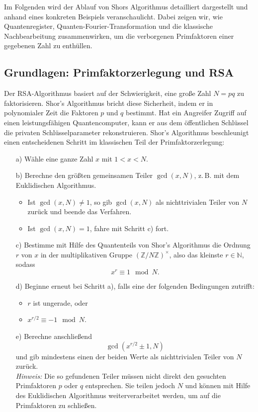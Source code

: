 Im Folgenden wird der Ablauf von Shors Algorithmus detailliert dargestellt und anhand eines konkreten Beispiels veranschaulicht. Dabei zeigen wir, wie Quantenregister, Quanten-Fourier-Transformation und die klassische Nachbearbeitung zusammenwirken, um die verborgenen Primfaktoren einer gegebenen Zahl zu enthüllen.\\


\subsection{Grundlagen: Primfaktorzerlegung und RSA}
Der RSA-Algorithmus basiert auf der Schwierigkeit, eine große Zahl \( N = pq \) zu faktorisieren. Shor’s Algorithmus bricht diese Sicherheit, indem er in polynomialer Zeit die Faktoren \( p \) und \( q \) bestimmt. Hat ein Angreifer Zugriff auf einen leistungsfähigen Quantencomputer, kann er aus dem öffentlichen Schlüssel die privaten Schlüsselparameter rekonstruieren. Shor's Algorithmus beschleunigt einen entscheidenen Schritt im klassischen Teil der Primfaktorzerlegung:

\begin{itemize}
  \item[a)] Wähle eine ganze Zahl \(x\) mit \(1 < x < N\).
  
  \item[b)] Berechne den größten gemeinsamen Teiler \(\gcd(x, N)\), z.\,B. mit dem Euklidischen Algorithmus.  
  \begin{itemize}
    \item Ist \(\gcd(x, N) \ne 1\), so gib \(\gcd(x, N)\) als nichttrivialen Teiler von \(N\) zurück und beende das Verfahren.
    \item Ist \(\gcd(x, N) = 1\), fahre mit Schritt c) fort.
  \end{itemize}
  
  \item[c)] Bestimme mit Hilfe des Quantenteils von Shor's Algorithmus die Ordnung \(r\) von \(x\) in der multiplikativen Gruppe \((\mathbb{Z}/N\mathbb{Z})^\times\), also das kleinste \(r \in \mathbb{N}\), sodass
  \[
  x^r \equiv 1 \mod N.
  \]
  
  \item[d)] Beginne erneut bei Schritt a), falls eine der folgenden Bedingungen zutrifft:
  \begin{itemize}
    \item \(r\) ist ungerade, oder
    \item \(x^{r/2} \equiv -1 \mod N\).
  \end{itemize}
  
  \item[e)] Berechne anschließend
  \[
  \gcd(x^{r/2} \pm 1, N)
  \]
  und gib mindestens einen der beiden Werte als nichttrivialen Teiler von \(N\) zurück.\\
  \[
  \]
  \textit{Hinweis:} Die so gefundenen Teiler müssen nicht direkt den gesuchten Primfaktoren \(p\) oder \(q\) entsprechen. Sie teilen jedoch \(N\) und können mit Hilfe des Euklidischen Algorithmus weiterverarbeitet werden, um auf die Primfaktoren zu schließen.
\end{itemize}


